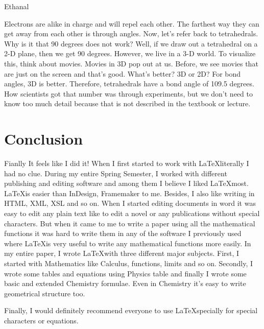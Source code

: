 \documentclass[12pt, a4paper]{article}
\begin{document}
{\huge 
    \setatomsep{2em}
    \chemname
    {}
    {Ethanal}
}
\\
\space
\linebreak

\noindent
Electrons are alike in charge and will repel each other. The farthest way they can get away from each other is through angles. Now, let's refer back to tetrahedrals. Why is it that 90 degrees does not work? Well, if we draw out a tetrahedral on a 2-D plane, then we get 90 degrees. However, we live in a 3-D world. To visualize this, think about movies. Movies in 3D pop out at us. Before, we see movies that are just on the screen and that's good. What's better? 3D or 2D? For bond angles, 3D is better. Therefore, tetrahedrals have a bond angle of 109.5 degrees. How scientists got that number was through experiments, but we don't need to know too much detail because that is not described in the textbook or lecture. 


\pagebreak

\section*{Conclusion}

Fianlly It feels like I did it! When I first started to work with \LaTeX literally I had no clue. During my entire Spring Semester, I worked with different publishing and editing software and among them I believe I liked \LaTeX most. \LaTeX is easier than InDesign, Framemaker to me. Besides, I also like writing in HTML, XML, XSL and so on. 
When I started editing documents in word it was easy to edit any plain text like to edit a novel or any publications without special characters. But when it came to me to write a paper using all the mathematical functions it was hard to write them in any of the software I previously used where \LaTeX is very useful to write any mathematical functions more easily.
In my entire paper, I wrote \LaTeX with three different major subjects. First, I started with Mathematics like Calculus, functions, limits and so on. Secondly, I wrote some tables and equations using Physics table and finally I wrote some basic and extended Chemistry formulae. Even in Chemistry it's easy to write geometrical structure too.

\noindent
Finally, I would definitely recommend everyone to use \LaTeX specially for special characters or equations.
\end{document}
